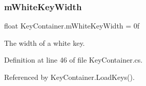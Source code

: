 \mbox{\label{group___key_contain_priv_var_gae5b8787a5242834f99ad8072e7ea6004}} 
\subsubsection{\texorpdfstring{m\+White\+Key\+Width}{mWhiteKeyWidth}}
{\footnotesize\ttfamily float Key\+Container.\+m\+White\+Key\+Width = 0f\hspace{0.3cm}{\ttfamily [private]}}



The width of a white key. 



Definition at line 46 of file Key\+Container.\+cs.



Referenced by Key\+Container.\+Load\+Keys().

